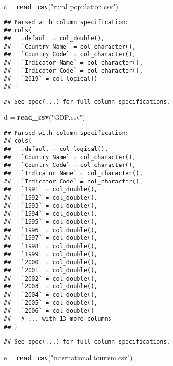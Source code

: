 \documentclass[ignorenonframetext,]{beamer}
\newenvironment{Shaded}{\begin{snugshade}}{\end{snugshade}}
\newcommand{\KeywordTok}[1]{\textcolor[rgb]{0.13,0.29,0.53}{\textbf{#1}}}
\newcommand{\NormalTok}[1]{#1}
\newcommand{\StringTok}[1]{\textcolor[rgb]{0.31,0.60,0.02}{#1}}
\begin{document}
\begin{frame}[fragile]
\begin{Shaded}
\begin{Highlighting}[]
\NormalTok{c =}\StringTok{ }\KeywordTok{read_csv}\NormalTok{(}\StringTok{"rural population.csv"}\NormalTok{)}
\end{Highlighting}
\end{Shaded}

\begin{verbatim}
## Parsed with column specification:
## cols(
##   .default = col_double(),
##   `Country Name` = col_character(),
##   `Country Code` = col_character(),
##   `Indicator Name` = col_character(),
##   `Indicator Code` = col_character(),
##   `2019` = col_logical()
## )
\end{verbatim}

\begin{verbatim}
## See spec(...) for full column specifications.
\end{verbatim}

\begin{Shaded}
\begin{Highlighting}[]
\NormalTok{d =}\StringTok{ }\KeywordTok{read_csv}\NormalTok{(}\StringTok{"GDP.csv"}\NormalTok{)}
\end{Highlighting}
\end{Shaded}

\begin{verbatim}
## Parsed with column specification:
## cols(
##   .default = col_logical(),
##   `Country Name` = col_character(),
##   `Country Code` = col_character(),
##   `Indicator Name` = col_character(),
##   `Indicator Code` = col_character(),
##   `1991` = col_double(),
##   `1992` = col_double(),
##   `1993` = col_double(),
##   `1994` = col_double(),
##   `1995` = col_double(),
##   `1996` = col_double(),
##   `1997` = col_double(),
##   `1998` = col_double(),
##   `1999` = col_double(),
##   `2000` = col_double(),
##   `2001` = col_double(),
##   `2002` = col_double(),
##   `2003` = col_double(),
##   `2004` = col_double(),
##   `2005` = col_double(),
##   `2006` = col_double()
##   # ... with 13 more columns
## )
\end{verbatim}

\begin{verbatim}
## See spec(...) for full column specifications.
\end{verbatim}

\begin{Shaded}
\begin{Highlighting}[]
\NormalTok{e =}\StringTok{ }\KeywordTok{read_csv}\NormalTok{(}\StringTok{"international tourism.csv"}\NormalTok{)}
\end{Highlighting}
\end{Shaded}


\end{frame}
\end{document}
